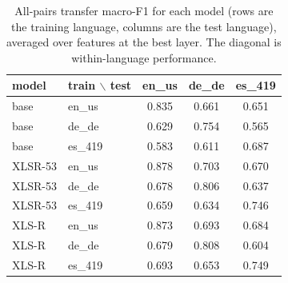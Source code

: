 \documentclass[twoside,11pt]{article}
\begin{document}
\begin{table}[h]
\centering
\small
\begin{tabular}{llccc}
\toprule
model & train $\backslash$ test & en\_us & de\_de & es\_419 \\
\midrule
base & en\_us & 0.835 & 0.661 & 0.651 \\
base & de\_de & 0.629 & 0.754 & 0.565 \\
base & es\_419 & 0.583 & 0.611 & 0.687 \\
\midrule
XLSR-53 & en\_us & 0.878 & 0.703 & 0.670 \\
XLSR-53 & de\_de & 0.678 & 0.806 & 0.637 \\
XLSR-53 & es\_419 & 0.659 & 0.634 & 0.746 \\
\midrule
XLS-R & en\_us & 0.873 & 0.693 & 0.684 \\
XLS-R & de\_de & 0.679 & 0.808 & 0.604 \\
XLS-R & es\_419 & 0.693 & 0.653 & 0.749 \\
\bottomrule
\end{tabular}
\caption{All-pairs transfer macro-F1 for each model (rows are the training
language, columns are the test language), averaged over features at the best layer.
The diagonal is within-language performance.}
\label{tab:matrix}
\end{table}
\end{document}
